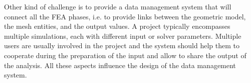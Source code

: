 Other kind of challenge is to provide a data management system that will connect all the FEA phases, i.e. to provide links between the geometric model, the mesh entities, and the output values. A project typically encompasses multiple simulations, each with different input or solver parameters. Multiple users are usually involved in the project and the system should help them to cooperate during the preparation of the input and allow to share the output of the analysis. All these aspects influence the design of the data management system.


